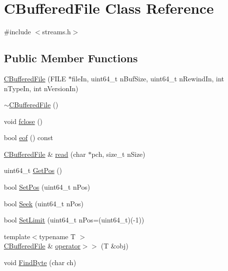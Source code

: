 \hypertarget{class_c_buffered_file}{}\section{C\+Buffered\+File Class Reference}
\label{class_c_buffered_file}


{\ttfamily \#include $<$streams.\+h$>$}

\subsection*{Public Member Functions}
\begin{DoxyCompactItemize}
\item 
\hyperlink{class_c_buffered_file_a30ad96a8d09bed60355d1fadda7dabdc}{C\+Buffered\+File} (F\+I\+L\+E $\ast$file\+In, uint64\+\_\+t n\+Buf\+Size, uint64\+\_\+t n\+Rewind\+In, int n\+Type\+In, int n\+Version\+In)
\item 
\hyperlink{class_c_buffered_file_a8804f689b27d3298cd5d63fbcddb97d1}{$\sim$\+C\+Buffered\+File} ()
\item 
void \hyperlink{class_c_buffered_file_aef8c993fe3eb0fa423d09d095f40dcf6}{fclose} ()
\item 
bool \hyperlink{class_c_buffered_file_abc0a2462d47ae5ba23c258291509dd6d}{eof} () const 
\item 
\hyperlink{class_c_buffered_file}{C\+Buffered\+File} \& \hyperlink{class_c_buffered_file_a20c6d2a4dbc69a8e5c7ba766d04b3d85}{read} (char $\ast$pch, size\+\_\+t n\+Size)
\item 
uint64\+\_\+t \hyperlink{class_c_buffered_file_af9e7226e682ede9c1c141fb2972afd7b}{Get\+Pos} ()
\item 
bool \hyperlink{class_c_buffered_file_aac4029a9aade127cc8a1fbbcc1549599}{Set\+Pos} (uint64\+\_\+t n\+Pos)
\item 
bool \hyperlink{class_c_buffered_file_afbf9abcc70f24824661aec96a4310a63}{Seek} (uint64\+\_\+t n\+Pos)
\item 
bool \hyperlink{class_c_buffered_file_adfcf370a41be0454e0f6b3dc358e415c}{Set\+Limit} (uint64\+\_\+t n\+Pos=(uint64\+\_\+t)(-\/1))
\item 
{\footnotesize template$<$typename T $>$ }\\\hyperlink{class_c_buffered_file}{C\+Buffered\+File} \& \hyperlink{class_c_buffered_file_ab570d5f1a173a41100e7b42b4aacbbc5}{operator$>$$>$} (T \&obj)
\item 
void \hyperlink{class_c_buffered_file_a15ce0683ba5925939d33f098a948236b}{Find\+Byte} (char ch)
\end{DoxyCompactItemize}
